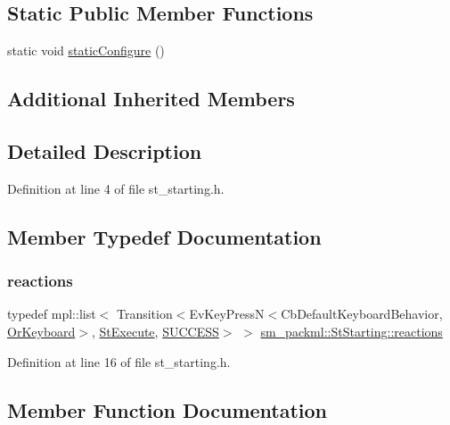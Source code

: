 \subsection*{Static Public Member Functions}
\begin{DoxyCompactItemize}
\item 
static void \hyperlink{structsm__packml_1_1StStarting_a41a4418153e0a3756f8f5f93d13aa16d}{static\+Configure} ()
\end{DoxyCompactItemize}
\subsection*{Additional Inherited Members}


\subsection{Detailed Description}


Definition at line 4 of file st\+\_\+starting.\+h.



\subsection{Member Typedef Documentation}
\mbox{\label{structsm__packml_1_1StStarting_a5874175ff382d18ac532b2ceeda18c8b}} 
\subsubsection{\texorpdfstring{reactions}{reactions}}
{\footnotesize\ttfamily typedef mpl\+::list$<$ Transition$<$Ev\+Key\+PressN$<$Cb\+Default\+Keyboard\+Behavior, \hyperlink{classsm__packml_1_1OrKeyboard}{Or\+Keyboard}$>$, \hyperlink{structsm__packml_1_1StExecute}{St\+Execute}, \hyperlink{classSUCCESS}{S\+U\+C\+C\+E\+SS}$>$ $>$ \hyperlink{structsm__packml_1_1StStarting_a5874175ff382d18ac532b2ceeda18c8b}{sm\+\_\+packml\+::\+St\+Starting\+::reactions}}



Definition at line 16 of file st\+\_\+starting.\+h.



\subsection{Member Function Documentation}
\mbox{\label{structsm__packml_1_1StStarting_ac300462fece8c35773780ac356c29653}} 
